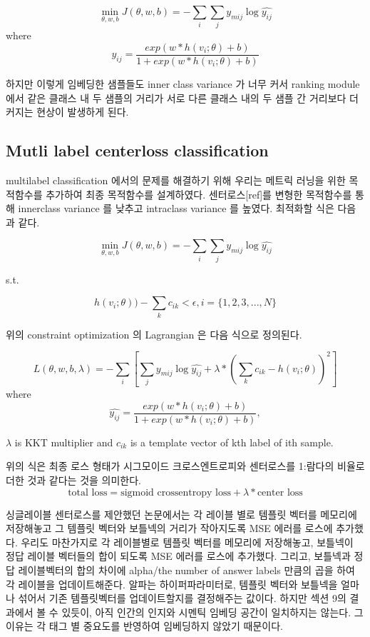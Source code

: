 \begin{equation}
\label{eqn:02}
\min_{\theta,w,b} J(\theta, w, b) = -\sum_i{ \sum_j{ y_{mij} \log{\hat{y_{ij}}}}}
\end{equation}
where  
\[
\hat{y_{ij}} = \frac{exp(w*h(v_i;\theta)+b)}{ 1 + exp(w*h(v_i;\theta)+b)}
\]

하지만 이렇게 임베딩한 샘플들도 inner class variance 가 너무 커서 ranking module 에서 같은 클래스 내 두 샘플의 거리가 서로 다른 클래스 내의 두 샘플 간 거리보다 더 커지는 현상이 발생하게 된다. 


\subsection{Mutli label centerloss classification}
multilabel classification 에서의 문제를 해결하기 위해 우리는 메트릭 러닝을 위한 목적함수를 추가하여 최종 목적함수를 설계하였다. 센터로스[ref]를 변형한 목적함수를 통해 innerclass variance 를 낮추고 intraclass variance 를 높였다. 최적화할 식은 다음과 같다. 

\begin{equation}
\label{eqn:03}
\min_{\theta,w,b} J(\theta, w, b) = -\sum_i{\sum_j{ y_{mij} \log{\hat{y_{ij}}}}}
\end{equation}

s.t.

\begin{equation}
\label{eqn:04}
 h(v_i;\theta)) - \sum_k{c_{ik}} < \epsilon , i = \{1,2,3, ..., N\}
\end{equation}

위의 constraint optimization 의 Lagrangian 은 다음 식으로 정의된다.

\begin{equation}
\label{eqn:05}
L(\theta, w, b, \lambda) = -\sum_i{[ \sum_j{ y_{mij} \log{\hat{y_{ij}}}} + \lambda * (\sum_k{c_{ik}} - h(v_i;\theta))^2]} 
\end{equation}
where 
\[
\hat{y_{ij}} = \frac{exp(w*h(v_i;\theta)+b)}{ 1 + exp(w*h(v_i;\theta)+b)},
\]

$\lambda$ is KKT multiplier and $c_{ik}$ is a template vector of kth label of ith sample.

위의 식은 최종 로스 형태가 시그모이드 크로스엔트로피와 센터로스를 1:람다의 비율로 더한 것과 같다는 것을 의미한다. 
\[
\text{total loss} = \text{sigmoid crossentropy loss} + \lambda*\text{center loss}
\]



싱글레이블 센터로스를 제안했던 논문에서는 각 레이블 별로 템플릿 벡터를 메모리에 저장해놓고 그 템플릿 벡터와 보틀넥의 거리가 작아지도록 MSE 에러를 로스에 추가했다. 우리도 마찬가지로 각 레이블별로 템플릿 벡터를 메모리에 저장해놓고, 보틀넥이 정답 레이블 벡터들의 합이 되도록 MSE 에러를 로스에 추가했다. 그리고, 보틀넥과 정답 레이블벡터의 합의 차이에 alpha/the number of answer labels 만큼의 곱을 하여 각 레이블을 업데이트해준다. 알파는 하이퍼파라미터로, 템플릿 벡터와 보틀넥을 얼마나 섞어서 기존 템플릿벡터를 업데이트할지를 결정해주는 값이다. 하지만 섹션 9의 결과에서 볼 수 있듯이, 아직 인간의 인지와 시멘틱 임베딩 공간이 일치하지는 않는다. 그 이유는 각 태그 별 중요도를 반영하여 임베딩하지 않았기 때문이다. 


